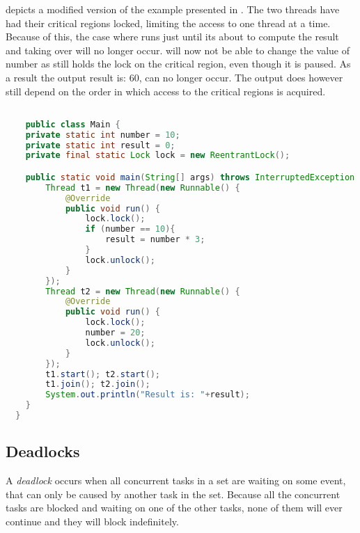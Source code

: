  depicts a modified version of the example presented in . The two threads have had their critical regions locked, limiting the access to one thread at a time. Because of this, the case where  runs just until its about to compute the result and   taking over will no longer occur.  will now not be able to change the value of number as  still holds the lock on the critical region, even though it is paused. As a result the output result is: 60, can no longer occur. The output does however still depend on the order in which access to the critical regions is acquired.
\begin{lstlisting}[float,label=lst:mutualexclusion,
  caption={Mutual exclusion in Java using a lock},
  language=Java,  
  showspaces=false,
  showtabs=false,
  breaklines=true,
  showstringspaces=false,
  breakatwhitespace=true,
  commentstyle=\color{greencomments},
  keywordstyle=\color{bluekeywords},
  stringstyle=\color{redstrings}]  % Start your code-block

	public class Main {
    private static int number = 10;
    private static int result = 0;
    private final static Lock lock = new ReentrantLock();

    public static void main(String[] args) throws InterruptedException {
        Thread t1 = new Thread(new Runnable() {
            @Override
            public void run() {
                lock.lock();
                if (number == 10){
                    result = number * 3;
                }
                lock.unlock();
            }
        });
        Thread t2 = new Thread(new Runnable() {
            @Override
            public void run() {
                lock.lock();
                number = 20;
                lock.unlock();
            }
        });
        t1.start(); t2.start();
        t1.join(); t2.join();
        System.out.println("Result is: "+result);
    }
  }
\end{lstlisting}
 
\subsection{Deadlocks}
A \emph{deadlock} occurs when all concurrent tasks in a set are waiting on some event, that can only be caused by another task in the set\cite[p. 435]{tanenbaum2008modern}. Because all the concurrent tasks are blocked and waiting on one of the other tasks, none of them will ever continue and they will block indefinitely.


